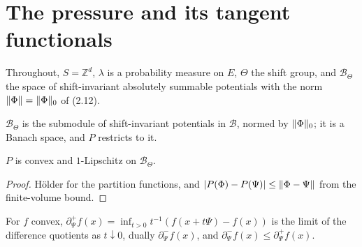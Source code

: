 \section{The pressure and its tangent functionals}

Throughout, $S = \mathbb Z^d$, $\lambda$ is a probability measure on $E$, $\Theta$ the shift group,
and $\mathcal B_\Theta$ the space of shift-invariant absolutely summable potentials with the norm
$\lVert \Phi\rVert = \lVert \Phi\rVert_0$ of (2.12).

\begin{definition}
    \label{def:tf-btheta}
    \leanok

    $\mathcal B_\Theta$ is the submodule of shift-invariant potentials in $\mathcal B$, normed by
    $\lVert \Phi\rVert_0$; it is a Banach space, and $P$ restricts to it.
\end{definition}

\begin{proposition}[Georgii (16.1)]
    \label{prop:tf-16-1}
    \leanok

    $P$ is convex and $1$-Lipschitz on $\mathcal B_\Theta$.
\end{proposition}
\begin{proof}
    \leanok
    Hölder for the partition functions, and $\lvert P(\Phi) - P(\Psi)\rvert \leq \lVert \Phi - \Psi\rVert$
    from the finite-volume bound.
\end{proof}

\begin{definition}
    \label{def:tf-16-2}
    \leanok

    For $f$ convex, $\partial^+_\Psi f(x) = \inf_{t > 0} t^{-1}(f(x + t\Psi) - f(x))$ is the limit
    of the difference quotients as $t \downarrow 0$, dually $\partial^-_\Psi f(x)$, and
    $\partial^-_\Psi f(x) \leq \partial^+_\Psi f(x)$.
\end{definition}

